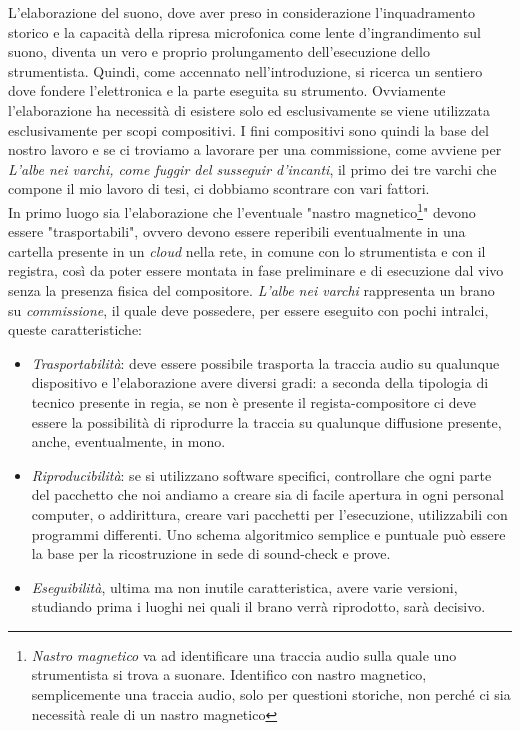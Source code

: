L'elaborazione del suono, dove aver preso in considerazione l'inquadramento storico e la capacità della ripresa microfonica come lente d'ingrandimento sul suono, diventa un vero e proprio prolungamento dell'esecuzione dello strumentista. Quindi, come accennato nell'introduzione, si ricerca un sentiero dove fondere l'elettronica e la parte eseguita su strumento. Ovviamente l'elaborazione ha necessità di esistere solo ed esclusivamente se viene utilizzata esclusivamente per scopi compositivi. I fini compositivi sono quindi la base del nostro lavoro e se ci troviamo a lavorare per una commissione, come avviene per \textit{L'albe nei varchi, come fuggir del susseguir d'incanti}, il primo dei tre varchi che compone il mio lavoro di tesi, ci dobbiamo scontrare con vari fattori. \\
In primo luogo sia l'elaborazione che l'eventuale "nastro magnetico\footnote{\textit{Nastro magnetico} va ad identificare una traccia audio sulla quale uno strumentista si trova a suonare. Identifico con nastro magnetico, semplicemente una traccia audio, solo per questioni storiche, non perché ci sia necessità reale di un nastro magnetico}" devono essere "trasportabili", ovvero devono essere reperibili eventualmente in una cartella presente in un \textit{cloud} nella rete, in comune con lo strumentista e con il registra, così da poter essere montata in fase preliminare e di esecuzione dal vivo senza la presenza fisica del compositore. \textit{L'albe nei varchi} rappresenta un brano su \textit{commissione}, il quale deve possedere, per essere eseguito con pochi intralci, queste caratteristiche:
\begin{itemize}
\item{\textit{Trasportabilità}: deve essere possibile trasporta la traccia audio su qualunque dispositivo e l'elaborazione avere diversi gradi: a seconda della tipologia di tecnico presente in regia, se non è presente il regista-compositore ci deve essere la possibilità di riprodurre la traccia su qualunque diffusione presente, anche, eventualmente, in mono.}
\item{\textit{Riproducibilità}: se si utilizzano software specifici, controllare che ogni parte del pacchetto che noi andiamo a creare sia di facile apertura in ogni personal computer, o addirittura, creare vari pacchetti per l'esecuzione, utilizzabili con programmi differenti. Uno schema algoritmico semplice e puntuale può essere la base per la ricostruzione in sede di sound-check e prove.}
\item{\textit{Eseguibilità}, ultima ma non inutile caratteristica, avere varie versioni, studiando prima i luoghi nei quali il brano verrà riprodotto, sarà decisivo.}
\end{itemize}